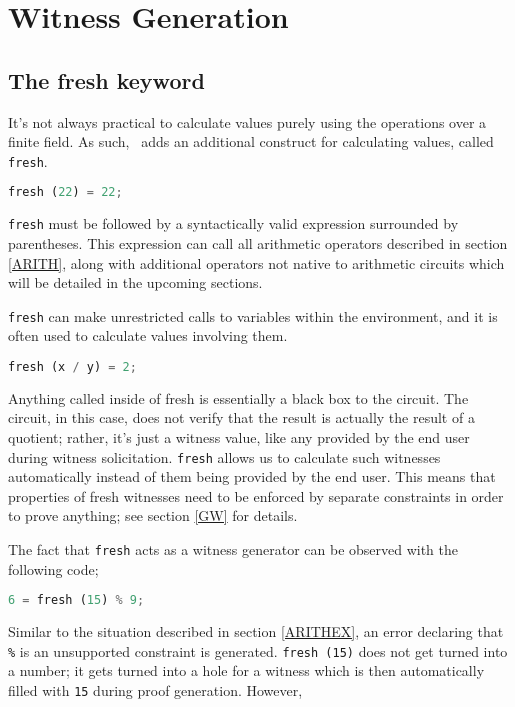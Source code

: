 \section{Witness Generation}

\subsection{The fresh keyword}

It's not always practical to calculate values purely using the operations over a finite field. As such, \vampir\ adds an additional construct for calculating values, called \lstinline{fresh}.

\begin{lstlisting}[language=Python]
  fresh (22) = 22;
\end{lstlisting}

\lstinline{fresh} must be followed by a syntactically valid expression surrounded by parentheses. This expression can call all arithmetic operators described in section \ref{ARITH}, along with additional operators not native to arithmetic circuits which will be detailed in the upcoming sections.

\lstinline{fresh} can make unrestricted calls to variables within the environment, and it is often used to calculate values involving them.

\begin{lstlisting}[language=Python]
  fresh (x / y) = 2;
\end{lstlisting}

Anything called inside of fresh is essentially a black box to the circuit. The circuit, in this case, does not verify that the result is actually the result of a quotient; rather, it's just a witness value, like any provided by the end user during witness solicitation. \lstinline{fresh} allows us to calculate such witnesses automatically instead of them being provided by the end user. This means that properties of fresh witnesses need to be enforced by separate constraints in order to prove anything; see section \ref{GW} for details.

The fact that \lstinline{fresh} acts as a witness generator can be observed with the following code;

\begin{lstlisting}[language=Python]
  6 = fresh (15) % 9;
\end{lstlisting}

Similar to the situation described in section \ref{ARITHEX}, an error declaring that \lstinline|%| is an unsupported constraint is generated. \lstinline{fresh (15)} does not get turned into a number; it gets turned into a hole for a witness which is then automatically filled with \lstinline|15| during proof generation. However,

